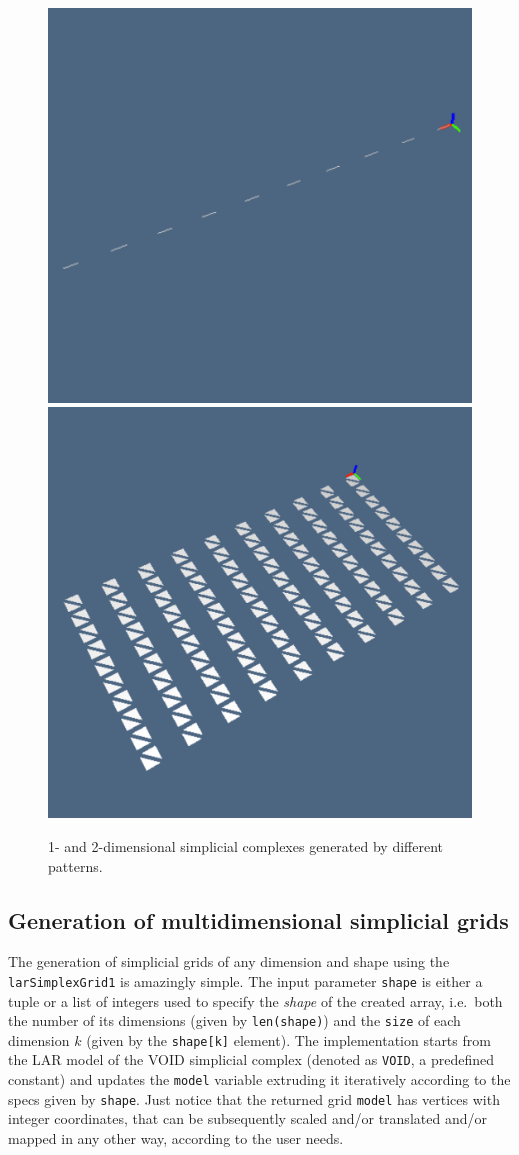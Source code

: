 \documentclass[11pt,oneside]{article}	%
\begin{document}
\begin{figure}[htbp] %
   \centering
   \includegraphics[height=0.25\linewidth,width=0.25\linewidth]{images/simplexn-2a} 
   \includegraphics[height=0.25\linewidth,width=0.25\linewidth]{images/simplexn-2b} 
   \caption{1- and 2-dimensional simplicial complexes generated by different patterns.}
   \label{fig:example}
\end{figure}


\subsection{Generation of multidimensional simplicial grids}

The generation of simplicial grids of any dimension and shape using the \texttt{larSimplexGrid1}
is amazingly simple. The input parameter \texttt{shape} is either a tuple or a list of integers used to specify the \emph{shape} of the created array, i.e.~both the number of its dimensions (given by \texttt{len(shape)}) and the \texttt{size} of each dimension $k$ (given by the \texttt{shape[k]} element).
The implementation starts from the LAR model of the VOID simplicial complex (denoted as \texttt{VOID}, a predefined constant) and updates the \texttt{model} variable extruding it iteratively according to the specs given by \texttt{shape}.
Just notice that the returned grid \texttt{model} has vertices with integer coordinates, that can be subsequently scaled and/or translated and/or mapped in any other way, according to the user needs.
\end{document}
